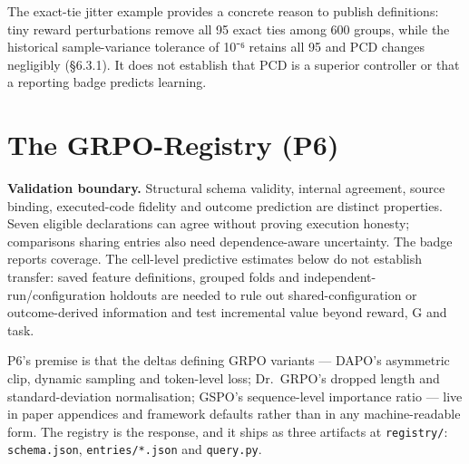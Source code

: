 \documentclass[12pt,a4paper]{report}
\begin{document}
The exact-tie jitter example provides a concrete reason to publish
definitions: tiny reward perturbations remove all 95 exact ties among
600 groups, while the historical sample-variance tolerance of 10⁻⁶
retains all 95 and PCD changes negligibly (§6.3.1). It does not
establish that PCD is a superior controller or that a reporting badge
predicts learning.

\section{The GRPO-Registry (P6)}\label{the-grpo-registry-p6}

\textbf{Validation boundary.} Structural schema validity, internal
agreement, source binding, executed-code fidelity and outcome prediction
are distinct properties. Seven eligible declarations can agree without
proving execution honesty; comparisons sharing entries also need
dependence-aware uncertainty. The badge reports coverage. The cell-level
predictive estimates below do not establish transfer: saved feature
definitions, grouped folds and independent-run/configuration holdouts
are needed to rule out shared-configuration or outcome-derived
information and test incremental value beyond reward, G and task.

P6's premise is that the deltas defining GRPO variants --- DAPO's
asymmetric clip, dynamic sampling and token-level loss; Dr.~GRPO's
dropped length and standard-deviation normalisation; GSPO's
sequence-level importance ratio \citep{zheng2025gspo} --- live in paper
appendices and framework defaults rather than in any machine-readable
form. The registry is the response, and it ships as three artifacts at
\texttt{registry/}: \texttt{schema.json}, \texttt{entries/*.json} and
\texttt{query.py}.
\end{document}
